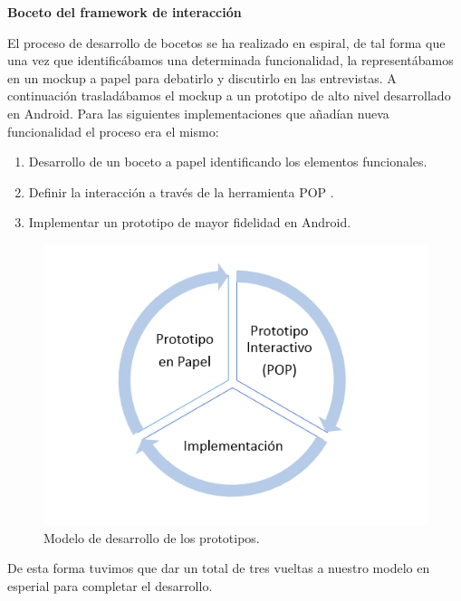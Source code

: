 \textbf{Boceto del framework de interacción}

El proceso de desarrollo de bocetos se ha realizado en espiral, de tal forma que una vez que identificábamos una determinada funcionalidad, la representábamos en un mockup a papel para debatirlo y discutirlo en las entrevistas. A continuación trasladábamos el mockup a un prototipo de alto nivel desarrollado en Android. Para las siguientes implementaciones que añadían nueva funcionalidad el proceso era el mismo:

\begin{enumerate}
 \item Desarrollo de un boceto a papel identificando los elementos funcionales.
 \item Definir la interacción a través de la herramienta POP \cite{ref:pop}.
 \item Implementar un prototipo de mayor fidelidad en Android. 
\end{enumerate}

  \begin{figure}[h]
   \centering
	\includegraphics[keepaspectratio, scale=1]{Media/Captures/prototypesDiagram.png}
    \caption{Modelo de desarrollo de los prototipos.}
   \label{fig:sequenceDiagram_waveWebSocket}
  \end{figure}
  
De esta forma tuvimos que dar un total de tres vueltas a nuestro modelo en esperial para completar el desarrollo.

